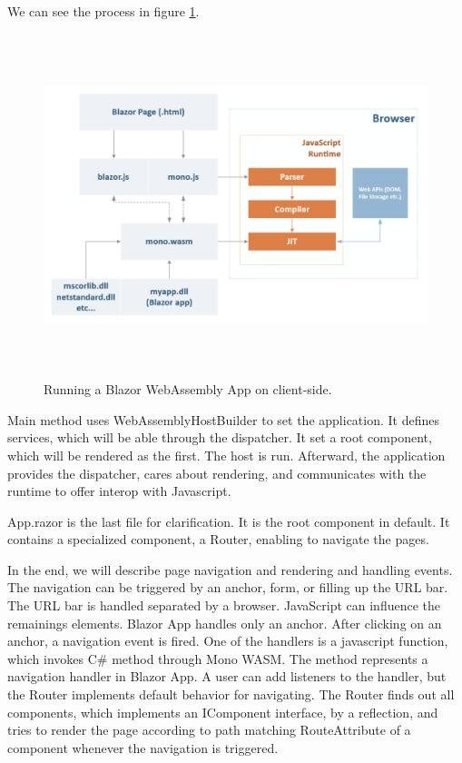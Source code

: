 We can see the process in figure \ref{img02:wasm}.
\par
\begin{figure}[H]\centering
\includegraphics[width=140mm, height=100mm]{./img/BlazorExecution}
\caption{Running a Blazor WebAssembly App on client-side.}
\label{img02:wasm}
\end{figure}
\par
Main method uses WebAssemblyHostBuilder to set the application.
It defines services, which will be able through the dispatcher.
It set a root component, which will be rendered as the first.
The host is run.
Afterward, the application provides the dispatcher, cares about rendering, and communicates with the runtime to offer interop with Javascript.
\par
App.razor is the last file for clarification.
It is the root component in default.
It contains a specialized component, a Router, enabling to navigate the pages.
\par
In the end, we will describe page navigation and rendering and handling events.
The navigation  can be triggered by an anchor, form, or filling up the URL bar.
The URL bar is handled separated by a browser.
JavaScript can influence the remainings elements.
Blazor App handles only an anchor.
After clicking on an anchor, a navigation event is fired.
One of the handlers is a javascript function, which invokes C\# method through Mono WASM. 
The method represents a navigation handler in Blazor App.
A user can add listeners to the handler, but the Router implements default behavior for navigating.
The Router finds out all components, which implements an IComponent interface, by a reflection, and tries to render the page according to path matching RouteAttribute of a component whenever the navigation is triggered.
